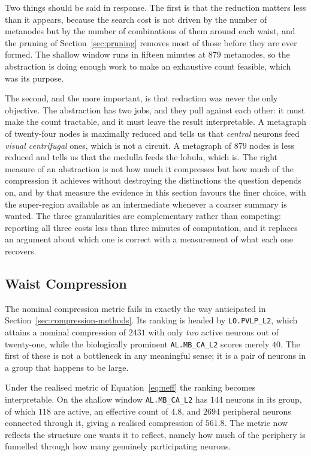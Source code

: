 \documentclass[12pt,a4paper,oneside]{article}
\theoremstyle{definition}
\theoremstyle{plain}
\newcommand{\code}[1]{\texttt{#1}}
\begin{document}
Two things should be said in response. The first is that the reduction
matters less than it appears, because the search cost is not driven by the
number of metanodes but by the number of combinations of them around each
waist, and the pruning of Section~\ref{sec:pruning} removes most of those
before they are ever formed. The shallow window runs in fifteen minutes at
$879$ metanodes, so the abstraction is doing enough work to make an
exhaustive count feasible, which was its purpose.

The second, and the more important, is that reduction was never the only
objective. The abstraction has two jobs, and they pull against each other:
it must make the count tractable, and it must leave the result
interpretable. A metagraph of twenty-four nodes is maximally reduced and
tells us that \emph{central} neurons feed \emph{visual centrifugal} ones,
which is not a circuit. A metagraph of $879$ nodes is less reduced and tells
us that the medulla feeds the lobula, which is. The right measure of an
abstraction is not how much it compresses but how much of the compression it
achieves without destroying the distinctions the question depends on, and by
that measure the evidence in this section favours the finer choice, with the
super-region available as an intermediate whenever a coarser summary is
wanted. The three granularities are complementary rather than competing:
reporting all three costs less than three minutes of computation, and it
replaces an argument about which one is correct with a measurement of what
each one recovers.

\subsection{Waist Compression}
\label{sec:results-compression}

The nominal compression metric fails in exactly the way anticipated in
Section~\ref{sec:compression-methods}. Its ranking is headed by
\code{LO.PVLP\_L2}, which attains a nominal compression of $2431$ with only
\emph{two} active neurons out of twenty-one, while the biologically
prominent \code{AL.MB\_CA\_L2} scores merely $40$. The first of these is not
a bottleneck in any meaningful sense; it is a pair of neurons in a group
that happens to be large.

Under the realised metric of Equation~\eqref{eq:neff} the ranking becomes
interpretable. On the shallow window \code{AL.MB\_CA\_L2} has $144$ neurons
in its group, of which $118$ are active, an effective count of $4.8$, and
$2694$ peripheral neurons connected through it, giving a realised
compression of $561.8$. The metric now reflects the structure one wants it
to reflect, namely how much of the periphery is funnelled through how many
genuinely participating neurons.
\end{document}
